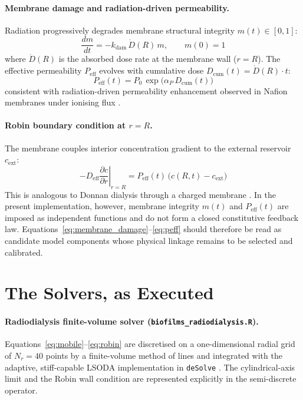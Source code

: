 \documentclass[11pt]{article}
\begin{document}
\paragraph{Membrane damage and radiation-driven permeability.}
Radiation progressively degrades membrane structural integrity $m(t) \in [0,1]$:
\begin{equation}
\frac{dm}{dt} = -k_{\mathrm{dam}}\,\dot{D}(R)\,m, \qquad m(0)=1
\label{eq:membrane_damage}
\end{equation}
where $\dot{D}(R)$ is the absorbed dose rate at the membrane wall ($r=R$).
The effective permeability $P_{\mathrm{eff}}$ evolves with cumulative dose
$D_{\mathrm{cum}}(t) = \dot{D}(R)\cdot t$:
\begin{equation}
P_{\mathrm{eff}}(t) = P_0\,\exp\!\bigl(\alpha_P\,D_{\mathrm{cum}}(t)\bigr)
\label{eq:peff}
\end{equation}
consistent with radiation-driven permeability enhancement observed in Nafion membranes under
ionising flux \cite{lara2023}.

\paragraph{Robin boundary condition at $r = R$.}
The membrane couples interior concentration gradient to the external reservoir $c_{\mathrm{ext}}$:
\begin{equation}
-D_{\mathrm{eff}}\left.\frac{\partial c}{\partial r}\right|_{r=R}
  = P_{\mathrm{eff}}(t)\,\bigl(c(R,t) - c_{\mathrm{ext}}\bigr)
\label{eq:robin}
\end{equation}
This is analogous to Donnan dialysis through a charged membrane \cite{aydogan2022,fox2009}.
In the present implementation, however, membrane integrity $m(t)$ and
$P_{\mathrm{eff}}(t)$ are imposed as independent functions and do not form a closed constitutive
feedback law. Equations~\ref{eq:membrane_damage}--\ref{eq:peff} should therefore be read as
candidate model components whose physical linkage remains to be selected and calibrated.


\section{The Solvers, as Executed}

\paragraph{Radiodialysis finite-volume solver (\texttt{biofilms\_radiodialysis.R}).}
Equations~\ref{eq:mobile}--\ref{eq:robin} are discretised on a one-dimensional radial grid of
$N_r=40$ points by a finite-volume method of lines and integrated with the adaptive, stiff-capable
LSODA implementation in \texttt{deSolve} \cite{soetaert2010}. The cylindrical-axis limit and the
Robin wall condition are represented explicitly in the semi-discrete operator.
\end{document}
